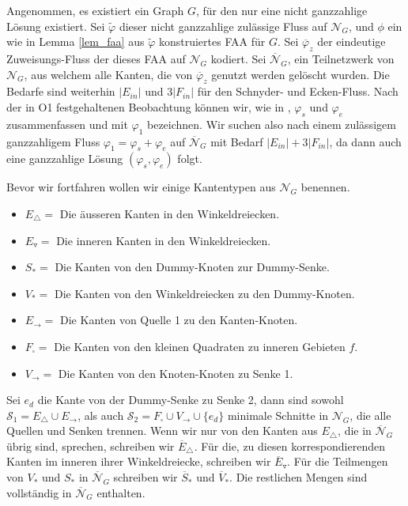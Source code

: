 Angenommen, es existiert ein Graph $G$, für den nur eine nicht ganzzahlige Lösung existiert. Sei $\tilde{\varphi}$ dieser nicht ganzzahlige zulässige Fluss auf $\mathcal{N}_G$, und $\phi$ ein wie in Lemma \ref{lem_faa} aus $\tilde{\varphi}$ konstruiertes FAA für $G$. Sei $\overline{\varphi}_z$ der eindeutige Zuweisungs-Fluss der dieses FAA auf $\mathcal{N}_G$ kodiert. Sei $\overline{\mathcal{N}}_G$, ein Teilnetzwerk von $\mathcal{N}_G$, aus welchem alle Kanten, die von $\overline{\varphi}_z$ genutzt werden gelöscht wurden. Die Bedarfe sind weiterhin $|E_{in}|$ und $3|F_{in}|$ für den Schnyder- und Ecken-Fluss. Nach der in O1 festgehaltenen Beobachtung können wir, wie in \cite{af15}, $\varphi_s$ und $\varphi_e$ zusammenfassen und mit $\varphi_1$ bezeichnen. Wir suchen also nach einem zulässigem ganzzahligem Fluss $\varphi_1 = \varphi_s + \varphi_e$ auf $\overline{\mathcal{N}}_G$ mit Bedarf $|E_{in}| + 3|F_{in}|$, da dann auch eine ganzzahlige Lösung $(\varphi_s,\varphi_e)$ folgt.

Bevor wir fortfahren wollen wir einige Kantentypen aus $\mathcal{N}_G$ benennen.

\begin{itemize}
\item $E_\triangle = $ Die äusseren Kanten in den Winkeldreiecken.
\item $E_\triangledown = $ Die inneren Kanten in den Winkeldreiecken.
\item $S_* =$ Die Kanten von den Dummy-Knoten zur Dummy-Senke.
\item $V_* = $ Die Kanten von den Winkeldreiecken zu den Dummy-Knoten.
\item $E_{\to} = $ Die Kanten von Quelle 1 zu den Kanten-Knoten.
\item $F_\square = $ Die Kanten von den kleinen Quadraten zu inneren Gebieten $f$.
\item $V_{\to} = $ Die Kanten von den Knoten-Knoten zu Senke 1.
\end{itemize}

Sei $e_{d}$ die Kante von der Dummy-Senke zu Senke 2, dann sind sowohl $\mathcal{S}_1 = E_\triangle \cup E_{\to}$, als auch $\mathcal{S}_2 = F_\square \cup V_{\to} \cup \{e_{d}\}$ minimale Schnitte in $\mathcal{N}_G$, die alle Quellen und Senken trennen. Wenn wir nur von den Kanten aus $E_\triangle$, die in $\overline{\mathcal{N}}_G$ übrig sind, sprechen, schreiben wir $\overline{E}_\triangle$. Für die, zu diesen korrespondierenden Kanten im inneren ihrer Winkeldreiecke, schreiben wir $\overline{E}_\triangledown$. Für die Teilmengen von $V_*$ und $S_*$ in $\overline{\mathcal{N}}_G$ schreiben wir $\overline{S}_*$ und $\overline{V}_*$. Die restlichen Mengen sind vollständig in $\overline{\mathcal{N}}_G$ enthalten.

